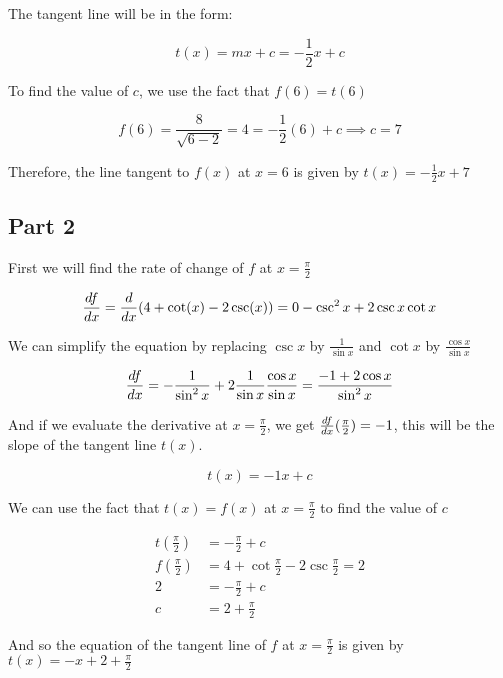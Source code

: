 \documentclass[12pt]{article} %
\newcommand*{\halfpi}{\frac{\pi}{2}}
\begin{document}
\begin{homeworkProblem}
    The tangent line will be in the form:

    $$
        t(x) = mx + c = - \frac{1}{2}x + c
    $$

    To find the value of $c$, we use the fact that $f(6) = t(6)$

    $$
        f(6) = \frac{8}{\sqrt{6 - 2}} = 4 = - \frac{1}{2}(6) + c \implies c = 7
    $$


    Therefore, the line tangent to $f(x)$ at $x = 6$ is given by $t(x) = - \frac{1}{2}x + 7$

    \pagebreak
    \subsection*{Part 2}

    First we will find the rate of change of $f$ at $x = \halfpi$

    $$
        \frac{df}{dx} = \frac{d}{dx} (4 + \cot(x) - 2 \csc(x)) = 0 - \csc^2{x} + 2 \csc{x} \cot{x}
    $$

    We can simplify the equation by replacing $\csc{x}$ by $\frac{1}{\sin{x}}$ and $\cot{x}$ by $\frac{\cos{x}}{\sin{x}}$

    $$
        \frac{df}{dx} =  - \frac{1}{\sin^2{x}} + 2 \frac{1}{\sin{x}} \frac{\cos{x}}{\sin{x}} = \frac{-1 + 2\cos{x}}{\sin^2{x}}
    $$

    And if we evaluate the derivative at $x = \halfpi$, we get $\deriv{f}{x}(\halfpi) = -1$, this will be the slope of the tangent line $t(x)$.

    $$
        t(x) = -1x + c
    $$

    We can use the fact that $t(x) = f(x)$ at $x = \halfpi$ to find the value of $c$

    \begin{align*}
        t(\halfpi) & = -\halfpi + c                            \\
        f(\halfpi) & = 4 + \cot{\halfpi} - 2\csc{\halfpi}  = 2 \\
        2          & = -\halfpi + c                            \\
        c          & = 2 + \halfpi
    \end{align*}

    And so the equation of the tangent line of $f$ at $x = \halfpi$ is given by $t(x) = -x + 2 + \halfpi$
\end{homeworkProblem}
\pagebreak
\end{document}
